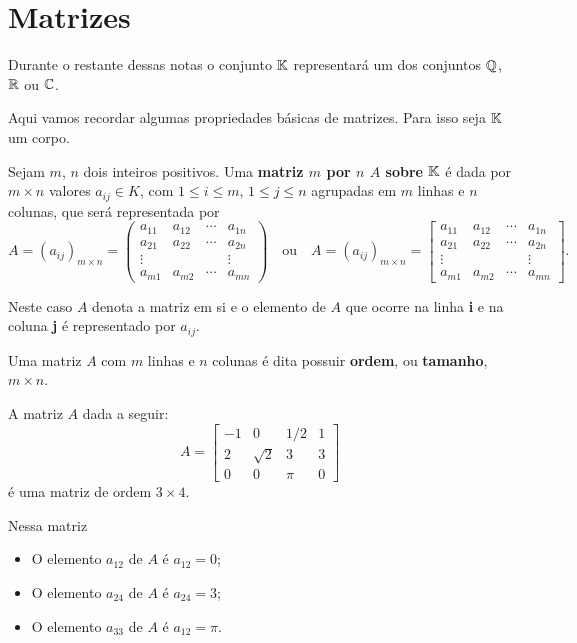 \section{Matrizes}

Durante o restante dessas notas o conjunto $\mathbb{K}$ representará um dos conjuntos $\mathbb{Q}$, $\mathbb{R}$ ou $\mathbb{C}$.

Aqui vamos recordar algumas propriedades b\'asicas de matrizes. Para isso seja $\mathbb{K}$ um corpo.

Sejam $m$, $n$ dois inteiros positivos. Uma \textbf{matriz $m$ por $n$ $A$ sobre $\mathbb{K}$} \'e dada por $m \times n$ valores $a_{ij} \in K$, com $1 \le i \le m$, $1 \le j \le n$ agrupadas em $m$ linhas e $n$ colunas, que ser\'a representada por
\[
	A = (a_{ij})_{m\times n} = \begin{pmatrix}
		a_{11} & a_{12} & \cdots & a_{1n}\\
		a_{21} & a_{22} & \cdots & a_{2n}\\
		\vdots & & & \vdots\\
		a_{m1} & a_{m2} & \cdots & a_{mn}
	\end{pmatrix} \quad\mbox{ou}\quad
	A = (a_{ij})_{m\times n} = \begin{bmatrix}
		a_{11} & a_{12} & \cdots & a_{1n}\\
		a_{21} & a_{22} & \cdots & a_{2n}\\
		\vdots & & & \vdots\\
		a_{m1} & a_{m2} & \cdots & a_{mn}
	\end{bmatrix}.
\]

Neste caso $A$ denota a matriz em si e o elemento de $A$ que ocorre na linha \textbf{i} e na coluna \textbf{j} é representado por $a_{ij}$.

Uma matriz $A$ com $m$ linhas e $n$ colunas é dita possuir \textbf{ordem}, ou \textbf{tamanho}, $m \times n$.

\begin{exemplo}
	A matriz $A$ dada a seguir:
	\[
		A = \begin{bmatrix}
			-1 & 0 & 1/2 & 1\\
			2 & \sqrt{2} & 3 & 3\\
			0 & 0 & \pi & 0
		\end{bmatrix}
	\]
	é uma matriz de ordem $3 \times 4$.

	Nessa matriz
	\begin{itemize}
		\item O elemento $a_{12}$ de $A$ é $a_{12} = 0$;

		\item O elemento $a_{24}$ de $A$ é $a_{24} = 3$;

		\item O elemento $a_{33}$ de $A$ é $a_{12} = \pi$.
	\end{itemize}
\end{exemplo}

